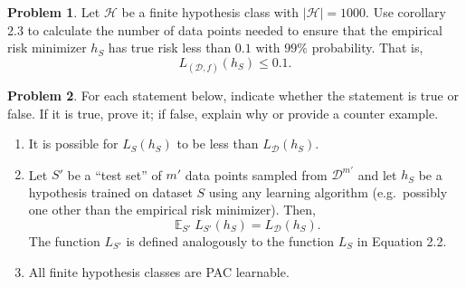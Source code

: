 \documentclass[10pt]{article}
\theoremstyle{definition}
\newtheorem{problem}{Problem}
\DeclareMathOperator{\E}{\mathbb E}
\begin{document}
\begin{problem}
    Let $\mathcal H$ be a finite hypothesis class with $|\mathcal H| = 1000$.
    Use corollary 2.3 to calculate the number of data points needed to ensure that the empirical risk minimizer $h_S$ has true risk less than $0.1$ with $99\%$ probability.
    That is,
    \begin{equation}
        L_{(\mathcal D,f)}(h_S) \le 0.1
        .
    \end{equation}
    \vspace{3in}
\end{problem}

\begin{problem}
    For each statement below, indicate whether the statement is true or false.
    If it is true, prove it; if false, explain why or provide a counter example.
    \begin{enumerate}

        \item
            It is possible for $L_S(h_S)$ to be less than $L_\mathcal D(h_S)$.
            \vspace{5in}

        \item
            Let $S'$ be a ``test set'' of $m'$ data points sampled from $\mathcal D^{m'}$
            and let $h_S$ be a hypothesis trained on dataset $S$ using any learning algorithm
            (e.g.\ possibly one other than the empirical risk minimizer).
            Then,
            \begin{equation}
                \E_{S'} L_{S'}(h_S) = L_\mathcal D(h_S)
                .
            \end{equation}
            The function $L_{S'}$ is defined analogously to the function $L_S$ in Equation 2.2.
            \vspace{4in}

        \item All finite hypothesis classes are PAC learnable.
            \vspace{4in}



\end{enumerate}
\end{problem}
\end{document}
